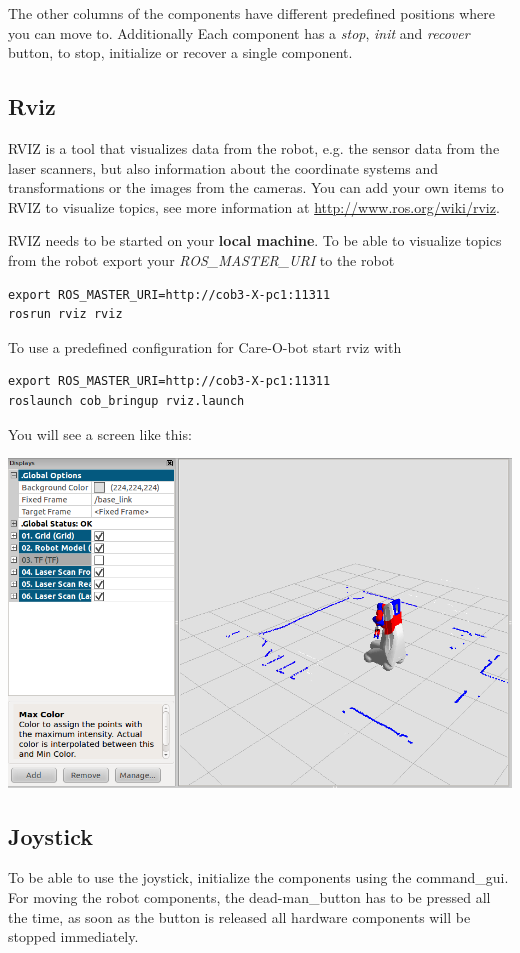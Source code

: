 The other columns of the components have different predefined positions where you can move to. Additionally Each component has a \textit{stop}, \textit{init} and \textit{recover} button, to stop, initialize or recover a single component.

\subsection{Rviz}
RVIZ is a tool that visualizes data from the robot, e.g. the sensor data from the laser scanners, but also information about the coordinate systems and transformations or the images from the cameras. You can add your own items to RVIZ to visualize topics, see more information at \url{http://www.ros.org/wiki/rviz}.

RVIZ needs to be started on your \textbf{local machine}. To be able to visualize topics from the robot export your \textit{ROS\_MASTER\_URI} to the robot
\begin{lstlisting}
export ROS_MASTER_URI=http://cob3-X-pc1:11311
rosrun rviz rviz
\end{lstlisting}

To use a predefined configuration for Care-O-bot start rviz with
\begin{lstlisting}
export ROS_MASTER_URI=http://cob3-X-pc1:11311
roslaunch cob_bringup rviz.launch
\end{lstlisting}

You will see a screen like this:
\begin {center}
\includegraphics[width=1\textwidth]{images/rviz.png}
\end{center}

\subsection{Joystick}
To be able to use the joystick, initialize the components using the command\_gui. For moving the robot components, the dead-man\_button has to be pressed all the time, as soon as the button is released all hardware components will be stopped immediately. 

